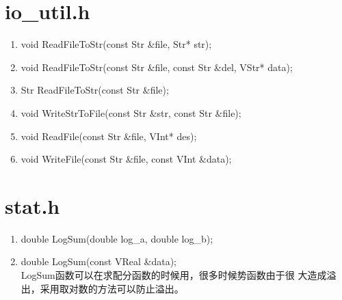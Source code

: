 \section{io\_util.h}
\begin{enumerate}
\item void ReadFileToStr(const Str \&file, Str* str);
\item void ReadFileToStr(const Str \&file, const Str \&del, VStr* data);
\item Str ReadFileToStr(const Str \&file);
\item void WriteStrToFile(const Str \&str, const Str \&file);
\item void ReadFile(const Str \&file, VInt* des);
\item void WriteFile(const Str \&file, const VInt \&data);
\end{enumerate}

\section{stat.h}
\begin{enumerate}
\item double LogSum(double log\_a, double log\_b);
\item double LogSum(const VReal \&data);
\\LogSum函数可以在求配分函数的时候用，很多时候势函数由于很
大造成溢出，采用取对数的方法可以防止溢出。
\end{enumerate}
